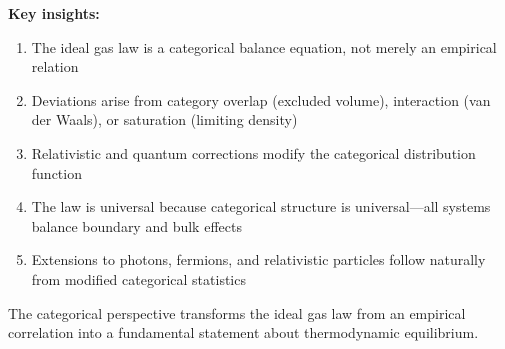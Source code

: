 \textbf{Key insights:}
\begin{enumerate}
\item The ideal gas law is a categorical balance equation, not merely an empirical relation
\item Deviations arise from category overlap (excluded volume), interaction (van der Waals), or saturation (limiting density)
\item Relativistic and quantum corrections modify the categorical distribution function
\item The law is universal because categorical structure is universal---all systems balance boundary and bulk effects
\item Extensions to photons, fermions, and relativistic particles follow naturally from modified categorical statistics
\end{enumerate}

The categorical perspective transforms the ideal gas law from an empirical correlation into a fundamental statement about thermodynamic equilibrium.
